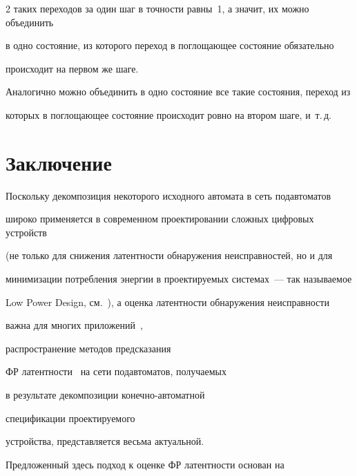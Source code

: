 \begin{multicols}{2}
таких переходов за один шаг в точности равны~1, а значит, их можно объединить


в одно состояние, из которого переход в поглощающее состояние обязательно


происходит на первом же шаге.


Аналогично можно объединить в одно состояние все такие состояния, переход из


которых в поглощающее состояние происходит ровно на втором шаге, и~т.\,д.





\vspace*{-6pt}







\section{Заключение}


\vspace*{-3pt}





 Поскольку декомпозиция некоторого исходного автомата в сеть подавтоматов


широко применяется в современном проектировании сложных цифровых устройств


(не только для снижения латентности обнаружения неисправностей, но и для


минимизации потребления энергии в проек\-ти\-ру\-емых системах~--- так называемое


Low Power Design, см.~\cite{11}), а оценка латентности обнаружения неисправности


важна для многих приложений~\cite{13, 12},\linebreak


распространение методов предсказания


ФР латентности~\cite{4} на сети подавтоматов, получаемых


в результате декомпозиции конечно-автоматной\linebreak


 спецификации проектируемого


устройства, пред\-став\-ля\-ет\-ся весьма актуальной.





 Предложенный здесь подход к оценке ФР латентности основан на



\end{multicols}
